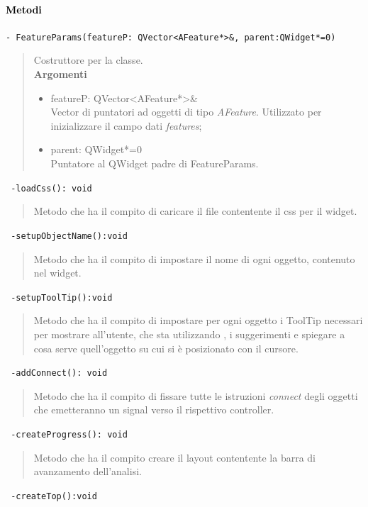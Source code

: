 \paragraph{\textcolor{black}{Metodi\\}}
\color{blue}\verb!- FeatureParams(featureP: QVector<AFeature*>&, parent:QWidget*=0)!
\begin{quote}
\color{black}Costruttore per la classe. \\
\textbf{Argomenti}
\begin{itemize}
\item featureP: QVector<AFeature*>\& \\ Vector di puntatori ad oggetti di tipo \emph{AFeature}. Utilizzato per inizializzare il campo dati \emph{features};
\item parent: QWidget*=0  \\ Puntatore al QWidget padre di FeatureParams.
\end{itemize}
\end{quote}
\color{blue}\verb! -loadCss(): void !
\begin{quote}
\color{black} Metodo che ha il compito di caricare il file contentente il css per il widget.
\end{quote} 
\color{blue}\verb! -setupObjectName():void!
\begin{quote}
\color{black} Metodo che ha il compito di impostare il nome di ogni oggetto, contenuto nel widget.
\end{quote} 
\color{blue}\verb! -setupToolTip():void!
\begin{quote}
\color{black} Metodo che ha il compito di impostare per ogni oggetto i ToolTip necessari per mostrare all'utente, che sta utilizzando \project{}, i suggerimenti e  spiegare a cosa serve quell'oggetto su cui si è posizionato con il cursore.
\end{quote} 
\color{blue}\verb! -addConnect(): void!
\color{black} 
\begin{quote}
Metodo che ha il compito di fissare tutte le istruzioni \emph{connect} degli oggetti che emetteranno un signal\g{} verso il rispettivo controller.
\end{quote} 
\color{blue}\verb! -createProgress(): void !
\begin{quote}
\color{black} Metodo che ha il compito creare il layout contentente la barra di avanzamento dell'analisi.
\end{quote} 
\color{blue}\verb! -createTop():void!
